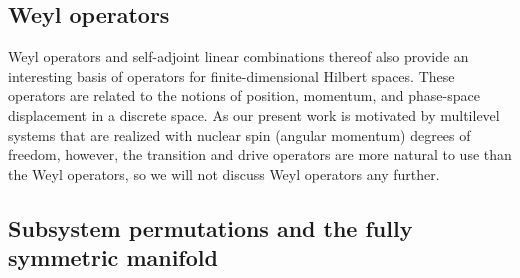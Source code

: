 \documentclass[nofootinbib,notitlepage,11pt]{revtex4-2}
\newcommand{\1}{\mathds{1}}
\begin{document}
\subsection{Weyl operators}

Weyl operators\cite{bertlmann2008bloch} and self-adjoint linear
combinations thereof\cite{asadian2016heisenbergweyl} also provide an
interesting basis of operators for finite-dimensional Hilbert spaces.
These operators are related to the notions of position, momentum, and
phase-space displacement in a discrete space.  As our present work is
motivated by multilevel systems that are realized with nuclear spin
(angular momentum) degrees of freedom, however, the transition and
drive operators are more natural to use than the Weyl operators, so we
will not discuss Weyl operators any further.

\subsection{Subsystem permutations and the fully symmetric manifold}
\label{sec:perm_ops}
\end{document}
